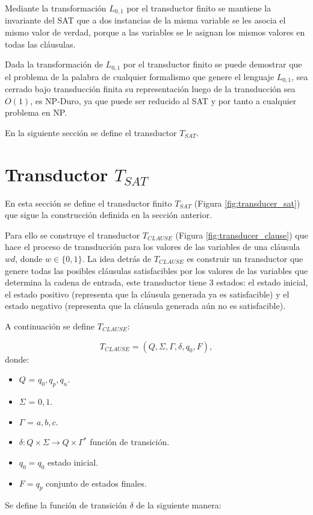 Mediante la transformación $L_{0,1}$ por el transductor finito se mantiene la invariante del SAT que a dos 
instancias de la misma variable se les asocia el mismo valor de verdad, porque a las variables se
le asignan los mismos valores en todas las cláusulas.

Dada la transformación de $L_{0,1}$ por el transductor finito se puede demostrar que el problema de la 
palabra de cualquier formalismo que genere el lenguaje $L_{0,1}$, sea cerrado bajo transducción finita 
su representación luego de la transducción sea $O(1)$, es NP-Duro, ya que puede ser reducido al SAT y por tanto a cualquier problema en NP. 

En la siguiente sección se define el transductor $T_{SAT}$.

\section{Transductor $T_{SAT}$}

En esta sección se define el transductor finito $T_{SAT}$ (Figura \ref{fig:transducer_sat}) que sigue la construcción definida en la sección anterior.

Para ello se construye el transductor $T_{CLAUSE}$ (Figura \ref{fig:transducer_clause}) que hace el proceso de 
transducción para los valores de las variables de una cláusula $wd$, donde $w\in \{0,1\}$. La idea detrás de $T_{CLAUSE}$
es construir un transductor que genere todas las posibles cláusulas satisfacibles por los valores de las variables
que determina la cadena de entrada, este transductor tiene 3 estados: el estado inicial, el estado positivo (representa que la
cláusula generada ya es satisfacible) y el estado negativo (representa que la cláusula generada aún no es satisfacible).

A continuación se define $T_{CLAUSE}$:

\[
    T_{CLAUSE} = (Q, {\Sigma}, \Gamma, \delta, q_{0}, F),
\]
donde:
\begin{itemize}
    \item \(Q\) = ${q_0,q_p,q_n}$.
    \item \(\Sigma\) = ${0,1}$.
    \item \(\Gamma\) = ${a,b,c}$.
    \item \(\delta: Q \times \Sigma \to Q \times \Gamma^*\) función de transición.
    \item \(q_{0} = q_0\) estado inicial.
    \item \(F={q_p}\) conjunto de estados finales.
\end{itemize}
Se define la función de transición $\delta$ de la siguiente manera:

